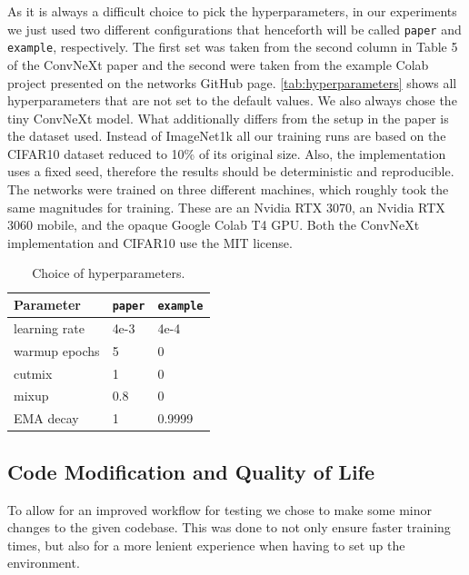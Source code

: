 \documentclass{article}
\begin{document}
As it is always a difficult choice to pick the hyperparameters, in our experiments we just used two different configurations that henceforth will be called \texttt{paper} and \texttt{example}, respectively.
The first set was taken from the second column in Table 5 of the ConvNeXt\cite{liu2022convnet} paper and the second were taken from the example Colab project presented on the networks GitHub page\cite{ayush0finetune}.
\autoref{tab:hyperparameters} shows all hyperparameters that are not set to the default values.
We also always chose the tiny ConvNeXt model.
What additionally differs from the setup in the paper is the dataset used.
Instead of ImageNet1k all our training runs are based on the CIFAR10\cite{krizhevsky2009learning} dataset reduced to 10\% of its original size.
Also, the implementation uses a fixed seed, therefore the results should be deterministic and reproducible.
The networks were trained on three different machines, which roughly took the same magnitudes for training.
These are an Nvidia RTX 3070, an Nvidia RTX 3060 mobile, and the opaque Google Colab T4 GPU\@.
Both the ConvNeXt implementation and CIFAR10 use the MIT license.
\begin{table}[h]
    \caption{Choice of hyperparameters.}
    \begin{center}
        \begin{tabular}{lll}
            \hline
            Parameter     & \texttt{paper} & \texttt{example} \\ \hline
            learning rate & 4e-3           & 4e-4             \\
            warmup epochs & 5              & 0                \\
            cutmix        & 1              & 0                \\
            mixup         & 0.8            & 0                \\
            EMA decay     & 1              & 0.9999
        \end{tabular}
    \end{center}
    \label{tab:hyperparameters}
\end{table}

\subsection{Code Modification and Quality of Life}\label{subsec:code-modification}
To allow for an improved workflow for testing we chose to make some minor changes to the given codebase.
This was done to not only ensure faster training times, but also for a more lenient experience when having to set up the environment.
\end{document}
